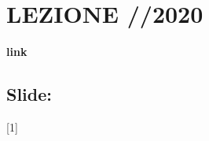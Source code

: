 \section{LEZIONE //2020}
\textbf{link} \url{}
\subsection{Slide: }
[1]
\newline[2]
\newline[3]
\newline[4]
\newline[5]
\newline[6]
\newline[7]
\newline[8]
\newline[9]
\newline[10]
\newline[11]
\newline[12]
\newline[13]
\newline[14]
\newline[15]
\newline[16]
\newline[17]
\newline[18]
\newline[19]
\newline[20]
\newline[21]
\newline[22]
\newline[23]
\newline[24]
\newline[25]
\newline[26]
\newline[27]
\newline[28]
\newline[29]
\newline[30]
\newline[31]
\newline[32]
\newline[33]